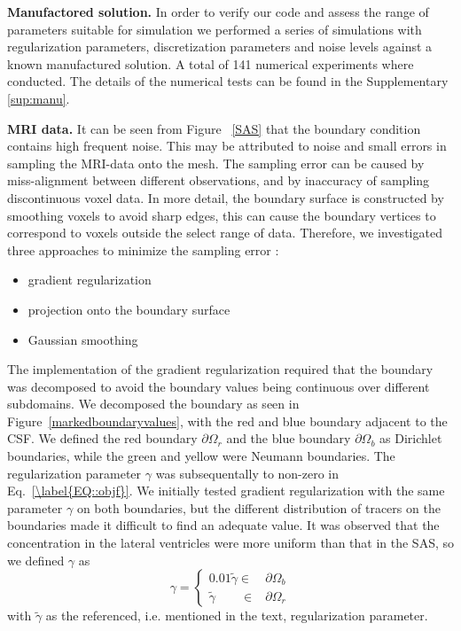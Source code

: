 \documentclass[12pt,a4paper]{article}
\begin{document}
\textbf{Manufactored solution.}
In order to verify our code and assess the range of parameters suitable for simulation we performed a series of 
simulations with regularization parameters, discretization parameters and noise levels against a known manufactured solution. A total of 141 numerical experiments
where conducted. The details of the numerical tests can be found in the Supplementary \ref{sup:manu}. 

\textbf{MRI data.}
It can be seen from Figure ~\ref{SAS} that the boundary condition contains high frequent noise. This may be attributed to noise and small errors in sampling the MRI-data onto the mesh. The sampling error can be caused by miss-alignment between different observations, and by inaccuracy of sampling discontinuous voxel data. In more detail, the boundary surface is constructed by smoothing voxels to avoid sharp edges, this can cause the boundary vertices to correspond to voxels outside the select range of data. Therefore, we investigated three approaches to minimize the sampling error : 
\begin{itemize}
\item gradient regularization 
\item projection onto the boundary surface
\item Gaussian smoothing 
\end{itemize} 
 
The implementation of the gradient regularization required that the boundary was decomposed to avoid the boundary values being continuous over different subdomains. We decomposed the boundary as seen in Figure~\ref{markedboundaryvalues}, with the red and blue boundary adjacent to the CSF. We defined the red boundary $\partial \Omega_r$ and the blue boundary $\partial \Omega_b$ as Dirichlet boundaries, while the green and yellow were Neumann boundaries. The regularization parameter $\gamma$ was subsequentally to non-zero in Eq.~\ref{\label{EQ::objf}}. We initially tested gradient regularization with the same parameter $\gamma$ on both boundaries, but the different distribution of tracers on the boundaries made it difficult to find an adequate value. It was observed that the concentration in the lateral ventricles were more uniform than that in the SAS, so we defined $\gamma$ as
\begin{equation}
\gamma = \begin{cases}
0.01\tilde{\gamma}  \in &\partial \Omega_{b} \\ 
\tilde{\gamma} \qquad \in  &\partial \Omega_{r}
\end{cases}  
\end{equation} 
with $\tilde{\gamma}$ as the referenced, i.e. mentioned in the text, regularization parameter.
\end{document}
